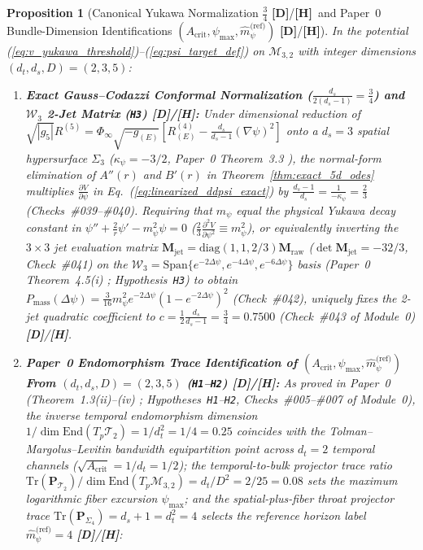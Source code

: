 \documentclass[11pt,a4paper]{article}
\newcommand{\catD}{\textbf{\textcolor{blue!75!black}{[D]}}}
\newcommand{\catH}{\textbf{\textcolor{orange!85!black}{[H]}}}
\newtheorem{proposition}[theorem]{Proposition}
\theoremstyle{definition}
\theoremstyle{remark}
\begin{document}
\begin{proposition}[Canonical Yukawa Normalization $\frac{3}{4}$ \catD/\catH\ and Paper~0 Bundle-Dimension Identifications $(A_{\text{crit}}, \psi_{\max}, \hat{m}_{\psi}^{\text{(ref)}})$ \catD/\catH]
\label{thm:zero_param_yukawa_invariants}
In the potential (\ref{eq:v_yukawa_threshold})--(\ref{eq:psi_target_def}) on $\mathcal{M}_{3,2}$ with integer dimensions $(d_t, d_s, D) = (2, 3, 5)$:
\begin{enumerate}
  \item[\textnormal{(i)}] \textbf{Exact Gauss--Codazzi Conformal Normalization ($\frac{d_s}{2(d_s - 1)} = \frac{3}{4}$) and $\mathcal{W}_3$ 2-Jet Matrix (\texttt{H3}) \catD/\catH:} Under dimensional reduction of $\sqrt{|g_5|}R^{(5)} = \Phi_{\infty}\sqrt{-g_{(E)}}[R^{(4)}_{(E)} - \frac{d_s}{d_s-1}(\nabla\psi)^2]$ onto a $d_s = 3$ spatial hypersurface $\Sigma_3$ ($\kappa_\psi = -3/2$, Paper~0 Theorem~3.3 \cite{JV_Paper0}), the normal-form elimination of $A''(r)$ and $B'(r)$ in Theorem~\ref{thm:exact_5d_odes} multiplies $\frac{\partial V}{\partial\psi}$ in Eq.~(\ref{eq:linearized_ddpsi_exact}) by $\frac{d_s - 1}{d_s} = \frac{1}{-\kappa_\psi} = \frac{2}{3}$ (Checks~\#039--\#040). Requiring that $m_{\psi}$ equal the physical Yukawa decay constant in $\psi'' + \frac{2}{r}\psi' - m_{\psi}^2\psi = 0$ ($\frac{2}{3}\frac{\partial^2 V}{\partial\psi^2} \equiv m_{\psi}^2$), or equivalently inverting the $3\times 3$ jet evaluation matrix $\mathbf{M}_{\text{jet}} = \text{diag}(1, 1, 2/3)\mathbf{M}_{\text{raw}}$ ($\det\mathbf{M}_{\text{jet}} = -32/3$, Check~\#041) on the $\mathcal{W}_3 = \text{Span}\{e^{-2\Delta\psi}, e^{-4\Delta\psi}, e^{-6\Delta\psi}\}$ basis (Paper~0 Theorem~4.5(i) \cite{JV_Paper0}; Hypothesis~\texttt{H3}) to obtain $P_{\text{mass}}(\Delta\psi) = \frac{3}{16}m_\psi^2 e^{-2\Delta\psi}(1 - e^{-2\Delta\psi})^2$ (Check~\#042), uniquely fixes the 2-jet quadratic coefficient to $c = \frac{1}{2}\frac{d_s}{d_s - 1} = \frac{3}{4} = \mathbf{0.7500}$ (Check~\#043 of Module~0) \catD/\catH.
  \item[\textnormal{(ii)}] \textbf{Paper~0 Endomorphism Trace Identification of $(A_{\text{crit}}, \psi_{\max}, \hat{m}_{\psi}^{\text{(ref)}})$ From $(d_t, d_s, D) = (2, 3, 5)$ (\texttt{H1}--\texttt{H2}) \catD/\catH:} As proved in Paper~0 (Theorem~1.3(ii)--(iv) \cite{JV_Paper0}; Hypotheses~\texttt{H1}--\texttt{H2}, Checks~\#005--\#007 of Module~0), the inverse temporal endomorphism dimension $1/\dim\text{End}(T_p\mathcal{T}_2) = 1/d_t^2 = 1/4 = 0.25$ coincides with the Tolman--Margolus--Levitin bandwidth equipartition point across $d_t = 2$ temporal channels ($\sqrt{A_{\text{crit}}} = 1/d_t = 1/2$); the temporal-to-bulk projector trace ratio $\text{Tr}(\mathbf{P}_{\mathcal{T}_2})/\dim\text{End}(T_p\mathcal{M}_{3,2}) = d_t / D^2 = 2/25 = 0.08$ sets the maximum logarithmic fiber excursion $\psi_{\max}$; and the spatial-plus-fiber throat projector trace $\text{Tr}(\mathbf{P}_{\Sigma_4}) = d_s + 1 = d_t^2 = 4$ selects the reference horizon label $\hat{m}_{\psi}^{\text{(ref)}} = 4$ \catD/\catH:

\end{enumerate}
\end{proposition}
\end{document}
